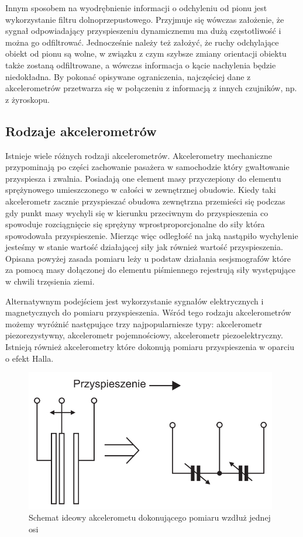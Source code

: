 Innym sposobem na wyodrębnienie informacji o odchyleniu od pionu jest
wykorzystanie filtru dolnoprzepustowego. Przyjmuje się wówczas założenie, że
sygnał odpowiadający przyspieszeniu dynamicznemu ma dużą częstotliwość i można go
odfiltrować. Jednocześnie należy też założyć, że ruchy odchylające obiekt od
pionu są wolne, w związku z czym szybsze zmiany orientacji obiektu także zostaną
odfiltrowane, a wówczas informacja o kącie nachylenia będzie niedokładna. By
pokonać opisywane ograniczenia, najczęściej dane z akcelerometrów przetwarza się
w połączeniu z informacją z innych czujników, np. z żyroskopu.

\subsection{Rodzaje akcelerometrów}
Istnieje wiele różnych rodzaji akcelerometrów. Akcelerometry mechaniczne
przypominają po części zachowanie pasażera w samochodzie który gwałtowanie
przyspiesza i zwalnia. Posiadają one element masy przyczepiony do elementu
sprężynowego umieszczonego w całości w zewnętrznej obudowie. Kiedy taki
akcelerometr zacznie przyspieszać obudowa zewnętrzna przemieści się podczas gdy
punkt masy wychyli się w kierunku przeciwnym do przyspieszenia co spowoduje
rozciągnięcie się sprężyny wprostproporcjonalne do siły która spowodowała
przyspieszenie. Mierząc więc odległość na jaką nastąpiło wychylenie jesteśmy w
stanie wartość działającej siły jak również wartość przyspieszenia. Opisana
powyżej zasada pomiaru leży u podstaw działania sesjsmografów które za pomocą
masy dołączonej do elementu piśmiennego rejestrują siły występujące w chwili
trzęsienia ziemi. 

Alternatywnym podejściem jest wykorzystanie sygnałów elektrycznych i
magnetycznych do pomiaru przyspieszenia. Wśród tego rodzaju akcelerometrów
możemy wyróżnić następujące trzy najpopularniesze typy: akcelerometr
piezorezystywny, akcelerometr pojemnościowy, akcelerometr piezoelektryczny.
Istnieją również akcelerometry które dokonują pomiaru przyspieszenia w oparciu o
efekt Halla. 

\begin{figure}[h!]
 \centering
 \includegraphics[height=62mm]{../images/ch04/acc_intro.png}
 \caption{Schemat ideowy akcelerometu dokonującego pomiaru wzdłuż jednej osi}
 \label{fig:AkcelerometrIdeowyScheamt}
\end{figure}

